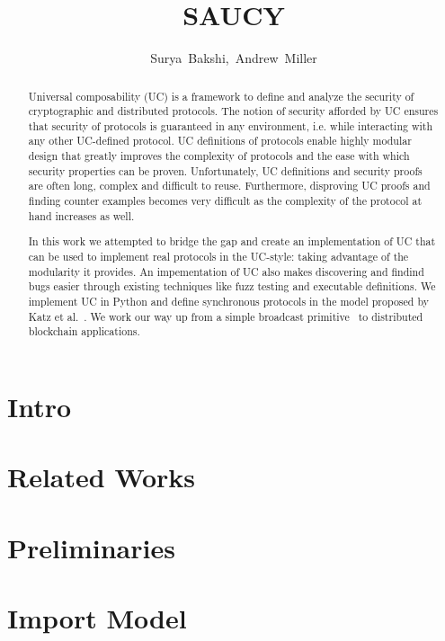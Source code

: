 \documentclass[11pt]{article}
\title{\bf SAUCY}
\author{\mbox{Surya Bakshi, Andrew Miller}}
\begin{document}
\pagestyle{fancy}

\maketitle

\begin{abstract}
Universal composability (UC) is a framework to define and analyze the security of cryptographic and distributed protocols.
The notion of security afforded by UC ensures that security of protocols is guaranteed in any environment, i.e. while interacting with any other UC-defined protocol. 
UC definitions of protocols enable highly modular design that greatly improves the complexity of protocols and the ease with which security properties can be proven.
Unfortunately, UC definitions and security proofs are often long, complex and difficult to reuse. 
Furthermore, disproving UC proofs and finding counter examples becomes very difficult as the complexity of the protocol at hand increases as well.

In this work we attempted to bridge the gap and create an implementation of UC that can be used to implement real protocols in the UC-style: taking advantage of the modularity it provides.
An impementation of UC also makes discovering and findind bugs easier through existing techniques like fuzz testing and executable definitions.
We implement UC in Python and define synchronous protocols in the model proposed by Katz et al.~\cite{katz-clock}. 
We work our way up from a simple broadcast primitive~\cite{bracha-broadcast} to distributed blockchain applications.
\end{abstract}

\section{Intro}

\section{Related Works}


\section{Preliminaries}


\section{Import Model}

\end{document}
